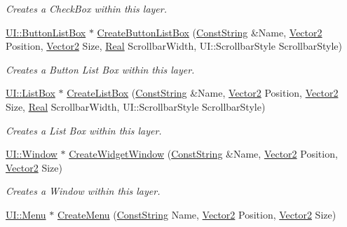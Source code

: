 \begin{DoxyCompactItemize}
\begin{DoxyCompactList}\small\item\em Creates a CheckBox within this layer. \item\end{DoxyCompactList}\item 
\hyperlink{classphys_1_1UI_1_1ButtonListBox}{UI::ButtonListBox} $\ast$ \hyperlink{classphys_1_1UILayer_aa5634ff2ed12c4168dc3c49ac601b933}{CreateButtonListBox} (\hyperlink{namespacephys_a5ce5049f8b4bf88d6413c47b504ebb31}{ConstString} \&Name, \hyperlink{classphys_1_1Vector2}{Vector2} Position, \hyperlink{classphys_1_1Vector2}{Vector2} Size, \hyperlink{namespacephys_af7eb897198d265b8e868f45240230d5f}{Real} ScrollbarWidth, UI::ScrollbarStyle ScrollbarStyle)
\begin{DoxyCompactList}\small\item\em Creates a Button List Box within this layer. \item\end{DoxyCompactList}\item 
\hyperlink{classphys_1_1UI_1_1ListBox}{UI::ListBox} $\ast$ \hyperlink{classphys_1_1UILayer_ac0901ce99a6fa2e3f4c2b8a44239349e}{CreateListBox} (\hyperlink{namespacephys_a5ce5049f8b4bf88d6413c47b504ebb31}{ConstString} \&Name, \hyperlink{classphys_1_1Vector2}{Vector2} Position, \hyperlink{classphys_1_1Vector2}{Vector2} Size, \hyperlink{namespacephys_af7eb897198d265b8e868f45240230d5f}{Real} ScrollbarWidth, UI::ScrollbarStyle ScrollbarStyle)
\begin{DoxyCompactList}\small\item\em Creates a List Box within this layer. \item\end{DoxyCompactList}\item 
\hyperlink{classphys_1_1UI_1_1Window}{UI::Window} $\ast$ \hyperlink{classphys_1_1UILayer_aaf8ca5a901a7300c63311be66309c6d7}{CreateWidgetWindow} (\hyperlink{namespacephys_a5ce5049f8b4bf88d6413c47b504ebb31}{ConstString} \&Name, \hyperlink{classphys_1_1Vector2}{Vector2} Position, \hyperlink{classphys_1_1Vector2}{Vector2} Size)
\begin{DoxyCompactList}\small\item\em Creates a Window within this layer. \item\end{DoxyCompactList}\item 
\hyperlink{classphys_1_1UI_1_1Menu}{UI::Menu} $\ast$ \hyperlink{classphys_1_1UILayer_abd620dfec955b4f2403ccb038a60f88f}{CreateMenu} (\hyperlink{namespacephys_a5ce5049f8b4bf88d6413c47b504ebb31}{ConstString} Name, \hyperlink{classphys_1_1Vector2}{Vector2} Position, \hyperlink{classphys_1_1Vector2}{Vector2} Size)

\end{DoxyCompactItemize}
